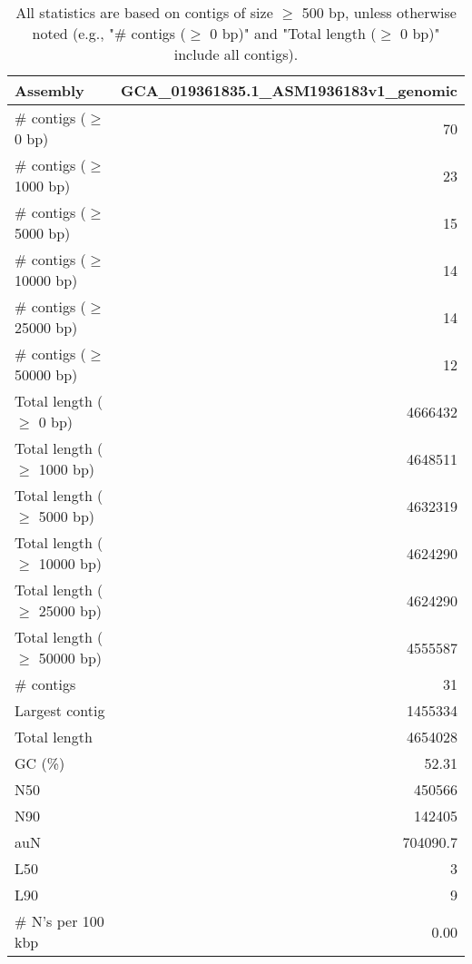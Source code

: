 \documentclass[12pt,a4paper]{article}
\begin{document}
\begin{table}[ht]
\begin{center}
\caption{All statistics are based on contigs of size $\geq$ 500 bp, unless otherwise noted (e.g., "\# contigs ($\geq$ 0 bp)" and "Total length ($\geq$ 0 bp)" include all contigs).}
\begin{tabular}{|l*{1}{|r}|}
\hline
Assembly & GCA\_019361835.1\_ASM1936183v1\_genomic \\ \hline
\# contigs ($\geq$ 0 bp) & 70 \\ \hline
\# contigs ($\geq$ 1000 bp) & 23 \\ \hline
\# contigs ($\geq$ 5000 bp) & 15 \\ \hline
\# contigs ($\geq$ 10000 bp) & 14 \\ \hline
\# contigs ($\geq$ 25000 bp) & 14 \\ \hline
\# contigs ($\geq$ 50000 bp) & 12 \\ \hline
Total length ($\geq$ 0 bp) & 4666432 \\ \hline
Total length ($\geq$ 1000 bp) & 4648511 \\ \hline
Total length ($\geq$ 5000 bp) & 4632319 \\ \hline
Total length ($\geq$ 10000 bp) & 4624290 \\ \hline
Total length ($\geq$ 25000 bp) & 4624290 \\ \hline
Total length ($\geq$ 50000 bp) & 4555587 \\ \hline
\# contigs & 31 \\ \hline
Largest contig & 1455334 \\ \hline
Total length & 4654028 \\ \hline
GC (\%) & 52.31 \\ \hline
N50 & 450566 \\ \hline
N90 & 142405 \\ \hline
auN & 704090.7 \\ \hline
L50 & 3 \\ \hline
L90 & 9 \\ \hline
\# N's per 100 kbp & 0.00 \\ \hline
\end{tabular}
\end{center}
\end{table}
\end{document}
